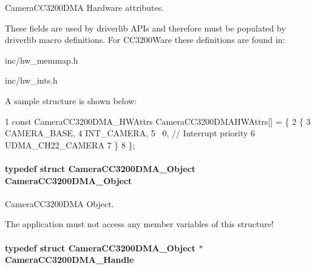 Camera\+C\+C3200\+D\+M\+A Hardware attributes. 

These fields are used by driverlib A\+P\+Is and therefore must be populated by driverlib macro definitions. For C\+C3200\+Ware these definitions are found in\+:
\begin{DoxyItemize}
\item inc/hw\+\_\+memmap.\+h
\item inc/hw\+\_\+ints.\+h
\end{DoxyItemize}

A sample structure is shown below\+: 
\begin{DoxyCode}
1 const CameraCC3200DMA\_HWAttrs CameraCC3200DMAHWAttrs[] = \{
2     \{
3         CAMERA\_BASE,
4         INT\_CAMERA,
5         ~0,                   // Interrupt priority
6         UDMA\_CH22\_CAMERA
7     \}
8 \};
\end{DoxyCode}
\paragraph[{Camera\+C\+C3200\+D\+M\+A\+\_\+\+Object}]{\setlength{\rightskip}{0pt plus 5cm}typedef struct {\bf Camera\+C\+C3200\+D\+M\+A\+\_\+\+Object}  {\bf Camera\+C\+C3200\+D\+M\+A\+\_\+\+Object}}\label{_camera_c_c3200_d_m_a_8h_a99f27056af98d8526508b92309c74852}


Camera\+C\+C3200\+D\+M\+A Object. 

The application must not access any member variables of this structure! 
\paragraph[{Camera\+C\+C3200\+D\+M\+A\+\_\+\+Handle}]{\setlength{\rightskip}{0pt plus 5cm}typedef struct {\bf Camera\+C\+C3200\+D\+M\+A\+\_\+\+Object} $\ast$ {\bf Camera\+C\+C3200\+D\+M\+A\+\_\+\+Handle}}\label{_camera_c_c3200_d_m_a_8h_a7f08041f20a289608a4077c1ae6e7bd9}


